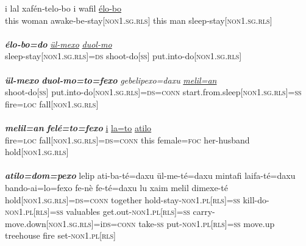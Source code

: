 \documentclass[output=paper]{LSP/langsci}
\begin{document}
\begin{exe}
\ex \label{Devex:04ae}
\begin{xlist}
\ex \label{Devex:04a}
\gll i lal 	xafén‑telo‑bo i wafil 	\underline{élo‑bo}\\
this woman awake‑be‑stay[\textsc{non1.sg.rls}] this	 man		sleep‑stay[\textsc{non1.sg.rls}]\\
\glt {}\\
\ex \label{Devex:04b}
\gll \textit{\textbf{élo-bo=do}} \textit{\underline{ül-mexo}} \underline{\textit{duol-mo}}\\
sleep-stay[\textsc{non1.sg.rls}]=\textsc{ds} shoot-do[\textsc{ss}] put.into-do[\textsc{non1.sg.rls}]\\ 
\glt {}\\
\ex \label{Devex:04c}
\gll \textit{\textbf{ül-mexo}} \textit{\textbf{duol-mo=to=fexo}} \textit{gebelipexo=daxu} \textit{\underline{melil=an}} \textit{\underline{}}\\		shoot-do[\textsc{ss}] put.into-do[\textsc{non1.sg.rls}]=\textsc{ds}=\textsc{conn} start.from.sleep[\textsc{non1.sg.rls}]=\textsc{ss}		fire=\textsc{loc} fall[\textsc{non1.sg.rls}] \\ 
\glt {}\\
\ex \label{Devex:04d}
\gll \textit{\textbf{melil=an}} \textit{\textbf{felé=to=fexo}} \underline{i} \underline{la=to} \underline{} \underline{atilo} \\		           
fire=\textsc{loc} fall[\textsc{non1.sg.rls}]=\textsc{ds=conn} this female=\textsc{foc}	her-husband	hold[\textsc{non1.sg.rls}]\\
\glt {}\\
\ex \label{Devex:04e}
\gll \textit{\textbf{atilo=dom=pexo}} lelip ati-ba-té=daxu ül-me-té=daxu mintafi	laifa-té=daxu bando-ai=lo=fexo fe-nè fe-té=daxu lu	xaim melil	dimexe-té\\     	      
hold[\textsc{non1.sg.rls}]=\textsc{ds=conn} together hold-stay-\textsc{non1.pl[rls}]=\textsc{ss} kill-do-\textsc{non1.pl[rls]=ss} valuables get.out-\textsc{non1.pl[rls]=ss} carry-move.down[\textsc{non1.sg.rls}]=i\textsc{ds=conn} take-\textsc{ss} put-\textsc{non1.pl[rls]=ss}        
move.up treehouse fire set-\textsc{non1.pl[rls]}\\
\glt {} \citep[][208--209]{enk97}
\end{xlist}
\end{exe}
\end{document}
